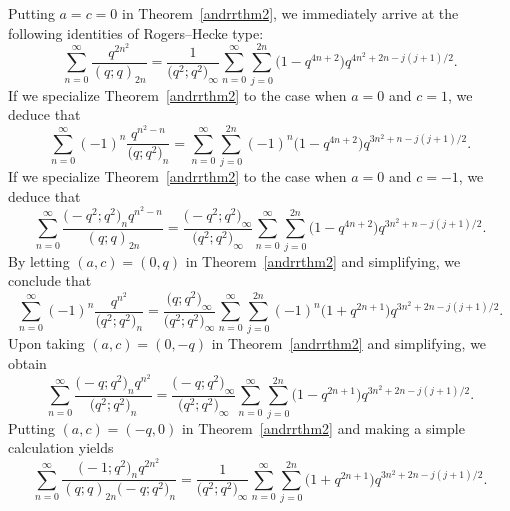 \documentclass[pdftex]{sigma}
\numberwithin{equation}{section}
\begin{document}
Putting $a=c=0$ in Theorem~\ref{andrrthm2}, we immediately arrive at the following identities of Rogers--Hecke type:
\begin{equation*}%
\sum_{n=0}^\infty \frac{q^{2n^2}}{(q; q)_{2n}}
=\frac{1}{\bigl(q^2; q^2\bigr)_\infty}	
\sum_{n=0}^\infty \sum_{j=0}^{2n} \bigl(1-q^{4n+2}\bigr) q^{4n^2+2n-j(j+1)/2}.
\end{equation*}
If we specialize Theorem~\ref{andrrthm2} to the case when $a=0$ and $c=1$, we deduce that
\begin{equation*}%
\sum_{n=0}^\infty(-1)^n\frac{q^{n^2-n}}{\bigl(q; q^2\bigr)_n}
=\sum_{n=0}^\infty \sum_{j=0}^{2n} (-1)^n \bigl(1-q^{4n+2}\bigr) q^{3n^2+n-j(j+1)/2}.
\end{equation*}
If we specialize Theorem~\ref{andrrthm2} to the case when $a=0$ and $c=-1$, we deduce that
\begin{equation*}%
	\sum_{n=0}^\infty \frac{\bigl(-q^2; q^2\bigr)_n q^{n^2-n}}{(q; q)_{2n}}
	=\frac{\bigl(-q^2; q^2\bigr)_\infty}{\bigl(q^2; q^2\bigr)_\infty}\sum_{n=0}^\infty \sum_{j=0}^{2n} \bigl(1-q^{4n+2}\bigr) q^{3n^2+n-j(j+1)/2}.
\end{equation*}
By letting $(a, c)=(0, q)$ in Theorem~\ref{andrrthm2} and simplifying, we conclude that
\begin{equation*}%
	\sum_{n=0}^\infty (-1)^n \frac{q^{n^2}}{\bigl(q^2; q^2\bigr)_n}
	=\frac{\bigl(q; q^2\bigr)_\infty}{\bigl(q^2; q^2\bigr)_\infty}\sum_{n=0}^\infty \sum_{j=0}^{2n} (-1)^n \bigl(1+q^{2n+1}\bigr) q^{3n^2+2n-j(j+1)/2}.
\end{equation*}
Upon taking $(a, c)=(0, -q)$ in Theorem~\ref{andrrthm2} and simplifying, we obtain
\begin{equation*}%
	\sum_{n=0}^\infty \frac{\bigl(-q; q^2\bigr)_n q^{n^2}}{\bigl(q^2; q^2\bigr)_n}
	=\frac{\bigl(-q; q^2\bigr)_\infty}{\bigl(q^2; q^2\bigr)_\infty}\sum_{n=0}^\infty \sum_{j=0}^{2n} \bigl(1-q^{2n+1}\bigr) q^{3n^2+2n-j(j+1)/2}.
\end{equation*}
Putting $(a, c)=(-q, 0)$ in Theorem~\ref{andrrthm2} and making a simple calculation yields
\begin{equation*}%
\sum_{n=0}^\infty \frac{\bigl(-1; q^2\bigr)_n q^{2n^2}}{(q; q)_{2n} \bigl(-q; q^2\bigr)_n}
=\frac{1}{\bigl(q^2; q^2\bigr)_\infty}
\sum_{n=0}^\infty \sum_{j=0}^{2n} \bigl(1+q^{2n+1}\bigr) q^{3n^2+2n-j(j+1)/2}.
\end{equation*}
\end{document}
